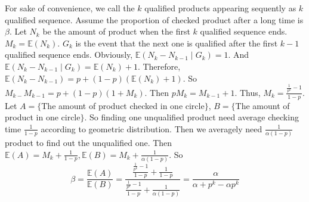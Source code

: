 \documentclass{ctexart}
\begin{document}
\begin{solution}
  For sake of convenience, we call the \(k\) qualified products appearing sequently as \(k\) qualified sequence.
  Assume the proportion of checked product after a long time is \(\beta\).
  Let \(N_k\) be the amount of product when the first \(k\) qualified sequence ends. \(M_k=\mathbb{E}(N_k)\). \(G_k\) is the
  event that the next one is qualified after the first \(k-1\) qualified sequence ends. Obviously, \(\mathbb{E}(N_k-N_{k-1} \mid G_k)=1\).
  And \(\mathbb{E}(N_k-N_{k-1} \mid G_k)=\mathbb{E}(N_k) + 1\).
  Therefore, \(\mathbb{E}(N_k-N_{k-1})=p + (1-p)(\mathbb{E}(N_k) + 1)\). So \(M_{k-} M_{k-1}=p + (1-p)( 1 + M_k)\).
  Then \(pM_k=M_{k-1} + 1\). Thus, \(M_k=\frac{\frac{1}{p^k}-1}{1-p}\).
  Let \(A=\{\)The amount of product checked in one circle\(\}\), \(B=\{\)The amount of product in one circle\(\}\).
  So finding one unqualified product need average checking time \(\frac{1}{1-p}\) according to geometric distribution.
  Then we averagely need \(\frac{1}{\alpha(1-p)}\) product to find out the unqualified one.
  Then \(\mathbb{E}(A)=M_k + \frac{1}{1-p}, \mathbb{E}(B)=M_k + \frac{1}{\alpha(1-p)}\).
  So \[
    \beta = \frac{\mathbb{E}(A)}{\mathbb{E}(B)}=\frac{\frac{\frac{1}{p^k}-1}{1-p} + \frac{1}{1-p}}{\frac{\frac{1}{p^k}-1}{1-p} + \frac{1}{\alpha(1-p)}}=\frac{\alpha}{\alpha + p^k-\alpha p^k}
  \]
\end{solution}
\end{document}

